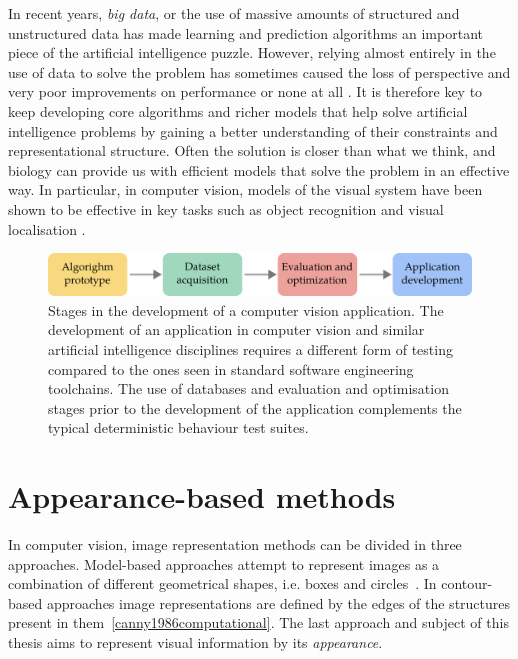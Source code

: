 In recent years, \textit{big data}, or the use of massive amounts of structured and unstructured data has made learning and prediction algorithms an important piece of the artificial intelligence puzzle. However, relying almost entirely in the use of data to solve the problem has sometimes caused the loss of perspective and very poor improvements on performance or none at all \cite{zhu2012we}. It is therefore key to keep developing core algorithms and richer models that help solve artificial intelligence problems by gaining a better understanding of their constraints and representational structure. Often the solution is closer than what we think, and biology can provide us with efficient models that solve the problem in an effective way. In particular, in computer vision, models of the visual system have been shown to be effective in key tasks such as object recognition and visual localisation \cite{lowe2004distinctive,milford2004ratslam}. 


\begin{figure}
\centering
\includegraphics[width=\linewidth]{gfx/Chapter01/cv_dev_pipeline.pdf}
\caption{Stages in the development of a computer vision application. The development of an application in computer vision and similar artificial intelligence disciplines requires a different form of testing compared to the ones seen in standard software engineering toolchains. The use of databases and evaluation and optimisation stages prior to the development of the application complements the typical deterministic behaviour test suites.}
\label{fig:cv_dev_pipeline}
\end{figure}

\section{Appearance-based methods}

In computer vision, image representation methods can be divided in three approaches. Model-based approaches attempt to represent images as a combination of different geometrical shapes, i.e. boxes and circles~\cite{biederman1987}. In contour-based approaches image representations are defined by the edges of the structures present in them~\ref{canny1986computational}. The last approach and subject of this thesis aims to represent visual information by its \textit{appearance}. 

